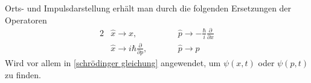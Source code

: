\documentclass{article}
\newcommand{\diff}{\mathrm{d}}
\newcommand{\commentmath}[1]{{\color{gruen}#1}}
\newcommand{\lr}[1]{\left(#1\right)}
\begin{document}
Orts- und Impulsdarstellung erhält man durch die folgenden Ersetzungen der Operatoren
	\begin{alignat}{2}
		&\hat{x}\rightarrow x, \qquad &&\hat{p} \rightarrow -\frac{\hbar}{i}\frac{\partial}{\partial x} \\
		&\hat{x}\rightarrow i\hbar\frac{\partial}{\partial p},\qquad && \hat{p}\rightarrow p
	\end{alignat}
\textcolor{gruen}{Wird vor allem in \ref{schrödinger gleichung} angewendet, um $\psi(x,t)$ oder $\psi(p,t)$ zu finden.}
%
%
%
\end{document}
